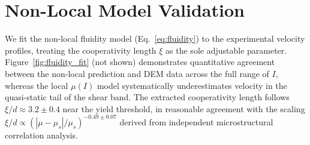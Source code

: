 \section{Non-Local Model Validation}

We fit the non-local fluidity model (Eq.~\ref{eq:fluidity}) to the experimental velocity profiles, treating the cooperativity length $\xi$ as the sole adjustable parameter. Figure~\ref{fig:fluidity_fit} (not shown) demonstrates quantitative agreement between the non-local prediction and DEM data across the full range of $I$, whereas the local $\mu(I)$ model systematically underestimates velocity in the quasi-static tail of the shear band. The extracted cooperativity length follows $\xi / d \approx 3.2 \pm 0.4$ near the yield threshold, in reasonable agreement with the scaling $\xi/d \propto (|\mu - \mu_s|/\mu_s)^{-0.49 \pm 0.07}$ derived from independent microstructural correlation analysis.
